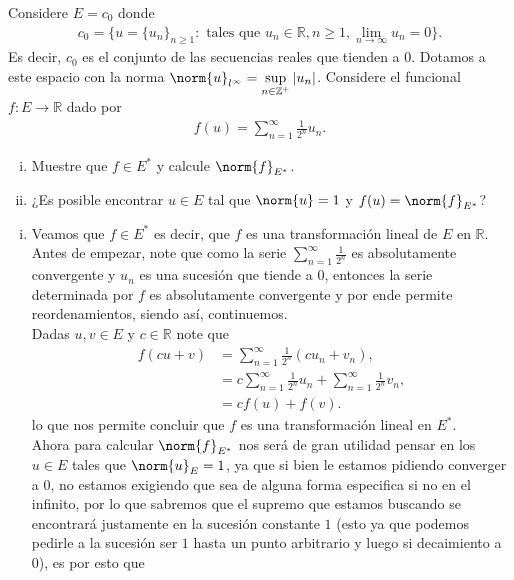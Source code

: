 \begin{homeworkProblem}
  Considere $E=c_0$ donde
  \begin{align*}
    c_0=\{u=\{u_n\}_{n\geq 1}: \text{ tales que }u_{n}\in\mathbb{R},n\geq 1,\lim_{n \to \infty}u_{n}=0\}.
  \end{align*}
  Es decir, $c_0$ es el conjunto de las secuencias reales que tienden a $0$. Dotamos a este espacio con la norma $\norm{u}_{l^{\infty}}=\displaystyle \sup_{n\in\mathbb{Z}^{+}}|u_{n}|$. Considere el funcional $f:E\to \mathbb{R}$ dado por
  \begin{align*}
    f(u)=\sum_{n=1}^{\infty}\frac{1}{2^{n}}u_{n}.
  \end{align*}
  \begin{enumerate}[(i)]
    \item Muestre que $f\in E^{*}$ y calcule $\norm{f}_{E^{*}}$.
    \item ¿Es posible encontrar $u\in E$ tal que $\norm{u}=1$ y $f(u)=\norm{f}_{E^{*}}$? 
  \end{enumerate}
  \begin{solution}
    \begin{enumerate}[(i)]
      \item Veamos que $f\in E^{*}$ es decir, que $f$ es una transformación lineal de $E$ en $\mathbb{R}$.\\
        Antes de empezar, note que como la serie $\sum_{n=1}^{\infty}\frac{1}{2^{n}}$ es absolutamente convergente y $u_n$ es una sucesión que tiende a $0$, entonces la serie determinada por $f$ es absolutamente convergente y por ende permite reordenamientos, siendo así, continuemos.\\
        Dadas $u,v\in E$ y $c\in \mathbb{R}$ note que
        \begin{align*}
          f(cu+v)&=\sum_{n=1}^{\infty}\frac{1}{2^{n}}\left( cu_n+v_n \right),\\
          &= c\sum_{n=1}^{\infty}\frac{1}{2^{n}}u_{n}+\sum_{n=1}^{\infty}\frac{1}{2^n}v_n,\\
          &=cf(u)+f(v).
        \end{align*}
        lo que nos permite concluir que $f$ es una transformación lineal en $E^*$.\\
        Ahora para calcular $\norm{f}_{E^{*}}$ nos será de gran utilidad pensar en los $u\in E$ tales que $\norm{u}_{E}=1$, ya que si bien le estamos pidiendo converger a $0$, no estamos exigiendo que sea de alguna forma especifica si no en el infinito, por lo que sabremos que el supremo que estamos buscando se encontrará justamente en la sucesión constante $1$ (esto ya que podemos pedirle a la sucesión ser $1$ hasta un punto arbitrario y luego si decaimiento a $0$), es por esto que 

\end{enumerate}
\end{solution}
\end{homeworkProblem}
